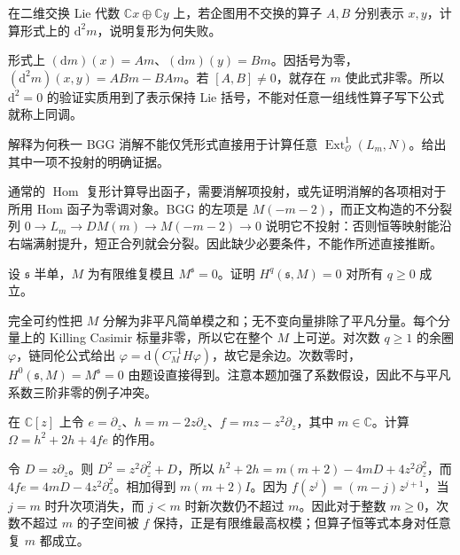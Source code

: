 \begin{optionalexercise}\label{b5:ex:20-differential-module-condition}
	在二维交换 Lie 代数 \(\mathbb Cx\oplus\mathbb Cy\) 上，若企图用不交换的算子 \(A,B\) 分别表示 \(x,y\)，计算形式上的 \(\mathrm{d}^2m\)，说明复形为何失败。
\end{optionalexercise}
\begin{solution}
	形式上 \((\mathrm{d}m)(x)=Am\)、\((\mathrm{d}m)(y)=Bm\)。因括号为零，\((\mathrm{d}^2m)(x,y)=ABm-BAm\)。若 \([A,B]\ne0\)，就存在 \(m\) 使此式非零。所以 \(\mathrm{d}^2=0\) 的验证实质用到了表示保持 Lie 括号，不能对任意一组线性算子写下公式就称上同调。
\end{solution}

\begin{optionalexercise}\label{b5:ex:20-bgg-not-projective}
	解释为何秩一 BGG 消解不能仅凭形式直接用于计算任意 \(\operatorname{Ext}^1_{\mathcal O}(L_m,N)\)。给出其中一项不投射的明确证据。
\end{optionalexercise}
\begin{solution}
	通常的 \(\operatorname{Hom}\) 复形计算导出函子，需要消解项投射，或先证明消解的各项相对于所用 Hom 函子为零调对象。BGG 的左项是 \(M(-m-2)\)，而正文构造的不分裂列 \(0\to L_m\to D M(m)\to M(-m-2)\to0\) 说明它不投射：否则恒等映射能沿右端满射提升，短正合列就会分裂。因此缺少必要条件，不能作所述直接推断。
\end{solution}

\begin{optionalexercise}\label{b5:ex:20-nontrivial-coefficient-all-degrees}
	设 \(\mathfrak s\) 半单，\(M\) 为有限维复模且 \(M^{\mathfrak s}=0\)。证明 \(H^q(\mathfrak s,M)=0\) 对所有 \(q\ge0\) 成立。
\end{optionalexercise}
\begin{solution}
	完全可约性把 \(M\) 分解为非平凡简单模之和；无不变向量排除了平凡分量。每个分量上的 Killing Casimir 标量非零，所以它在整个 \(M\) 上可逆。对次数 \(q\ge1\) 的余圈 \(\varphi\)，链同伦公式给出 \(\varphi=\mathrm{d}(C_M^{-1}H\varphi)\)，故它是余边。次数零时，\(H^0(\mathfrak s,M)=M^{\mathfrak s}=0\) 由题设直接得到。注意本题加强了系数假设，因此不与平凡系数三阶非零的例子冲突。
\end{solution}

\begin{optionalexercise}\label{b5:ex:20-differential-operator-casimir}
	在 \(\mathbb C[z]\) 上令 \(e=\partial_z\)、\(h=m-2z\partial_z\)、\(f=mz-z^2\partial_z\)，其中 \(m\in\mathbb C\)。计算 \(\Omega=h^2+2h+4fe\) 的作用。
\end{optionalexercise}
\begin{solution}
	令 \(D=z\partial_z\)。则 \(D^2=z^2\partial_z^2+D\)，所以 \(h^2+2h=m(m+2)-4mD+4z^2\partial_z^2\)，而 \(4fe=4mD-4z^2\partial_z^2\)。相加得到 \(m(m+2)I\)。因为 \(f(z^j)=(m-j)z^{j+1}\)，当 \(j=m\) 时升次项消失，而 \(j<m\) 时新次数仍不超过 \(m\)。因此对于整数 \(m\ge0\)，次数不超过 \(m\) 的子空间被 \(f\) 保持，正是有限维最高权模；但算子恒等式本身对任意复 \(m\) 都成立。
\end{solution}
